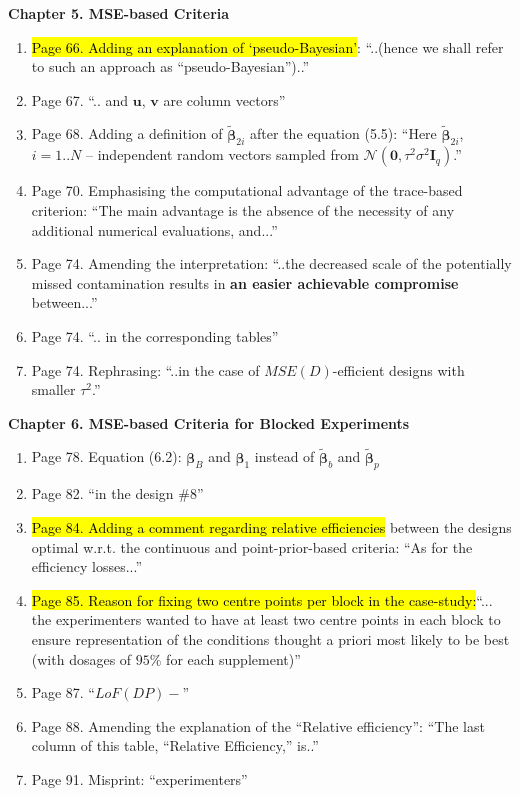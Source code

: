 \documentclass[11pt,a4paper,oneside]{article}
\begin{document}
\textbf{Chapter 5. MSE-based Criteria}
\begin{enumerate}
\item \hl{Page 66. Adding an explanation of `pseudo-Bayesian'}: ``..(hence we shall refer to such an approach as ``pseudo-Bayesian'')..''
\item Page 67. ``.. and $\bm{u}$, $\bm{v}$ are column vectors''
\item Page 68. Adding a definition of $\bm{\tilde{\beta}}_{2i}$ after the equation (5.5): ``Here $\bm{\tilde{\beta}}_{2i}$, $i=1..N$ -- independent random vectors sampled from $\mathcal{N}(\bm{0},\tau^{2}\sigma^{2}\bm{I}_{q})$.''
\item Page 70. Emphasising the computational advantage of the trace-based criterion: ``The main advantage is the absence of the necessity of any additional numerical evaluations, and...'' 
\item Page 74. Amending the interpretation: ``..the decreased scale of the potentially missed contamination results in \textbf{an easier achievable compromise} between...'' 
\item Page 74. ``.. in the corresponding tables'' 
\item Page 74. Rephrasing: ``..in the case of $MSE(D)$-efficient designs with smaller $\tau^2$.''
\end{enumerate}

\textbf{Chapter 6. MSE-based Criteria for Blocked Experiments}
\begin{enumerate}
\item Page 78. Equation (6.2): $\bm{\beta}_B$ and $\bm{\beta}_1$ instead of $\bm{\tilde{\beta}}_b$ and $\bm{\tilde{\beta}}_p$
\item Page 82. ``in the design \#$8$''
\item \hl{Page 84. Adding a comment regarding relative efficiencies} between the designs optimal w.r.t. the continuous and point-prior-based criteria: ``As for the efficiency losses...''
\item \hl{Page 85. Reason for fixing two centre points per block in the case-study:}``... the experimenters wanted to have at least two centre points in each block to ensure representation of the conditions thought a priori most likely to be best (with dosages of $95\%$ for each supplement)''
\item Page 87. ``$LoF(DP)-$''
\item Page 88. Amending the explanation of the ``Relative efficiency'': ``The last column of this table, ``Relative Efficiency,'' is..''
\item Page 91. Misprint: ``experimenters''
\end{enumerate}
\end{document}
